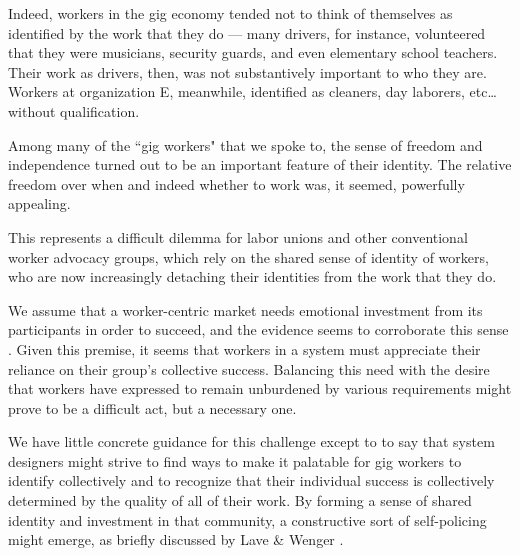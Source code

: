 Indeed, workers in the gig economy tended not to think of themselves as identified by the work that they do ---
many drivers, for instance, volunteered that they were musicians, security guards, and even elementary school teachers.
Their work as drivers, then, was not substantively important to who they are.
Workers at organization E, meanwhile, identified as cleaners, day laborers, etc\dots without qualification.

Among many of the ``gig workers" that we spoke to, the sense of freedom and independence turned out to be an important feature of their identity.
The relative freedom over when and indeed whether to work was, it seemed, powerfully appealing.

This represents a difficult dilemma for labor unions and other conventional worker advocacy groups,
which rely on the shared sense of identity of workers,
who are now increasingly detaching their identities from the work that they do.

We assume that a worker-centric market needs emotional investment from its participants in order to succeed,
and the evidence seems to corroborate this sense \cite{dynamo,olsonlogic,russell1982collective}.
Given this premise, it seems that workers in a system must appreciate their reliance on their group's collective success.
Balancing this need with the desire that workers have expressed to remain unburdened by various requirements might prove to be a difficult act, but a necessary one.

We have little concrete guidance for this challenge
except to to say that system designers might strive to find ways to make it palatable for gig workers to identify collectively
and to recognize that their individual success is collectively determined by the quality of all of their work.
By forming a sense of shared identity and investment in that community,
a constructive sort of self-policing might emerge, as briefly discussed by Lave \& Wenger \cite{lave1998communities}.